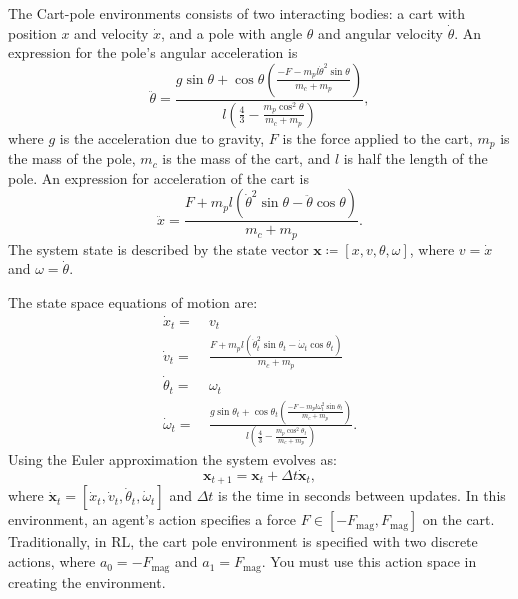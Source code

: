 \documentclass[]{article}
\begin{document}
The Cart-pole environments consists of two interacting bodies: a cart with position $x$ and velocity $\dot x$, and a pole with angle $\theta$ and angular velocity $\dot \theta$. 
%
An expression for the pole's angular acceleration is 
%
\begin{equation}
    \ddot \theta = \frac{g \sin{\theta} + \cos{\theta}\left( \frac{-F-m_p l \dot \theta^2 \sin \theta}{m_c + m_p}\right )}{l \left ( \frac{4}{3} - \frac{m_p \cos^2{\theta}}{m_c + m_p}\right )},
\end{equation}
%
where $g$ is the acceleration due to gravity, $F$ is the force applied to the cart, $m_p$ is the mass of the pole, $m_c$ is the mass of the cart, and $l$ is half the length of the pole. 
%
An expression for acceleration of the cart is 
%
\begin{equation}
    \ddot x = \frac{F + m_p l (\dot \theta^2 \sin{\theta} - \ddot \theta \cos{\theta})}{m_c + m_p}.    
\end{equation}
%
The system state is described by the state vector $\mathbf{x} \coloneqq [x, v, \theta, \omega ]$, where $v = \dot x$ and $\omega = \dot \theta$. 

The state space equations of motion are:
%
\begin{align}
    \dot x_{t} = &\ v_t \\
    \dot v_{t} = &\ \frac{F + m_p l (\dot \theta_t^2 \sin{\theta_t} - \dot \omega_t \cos{\theta_t})}{m_c + m_p} \\
    \dot \theta_t = &\ \omega_t \\
    \dot \omega_t = &\ \frac{g \sin{\theta_t} + \cos{\theta_t}\left( \frac{-F-m_p l \omega_t^2 \sin \theta_t}{m_c + m_p}\right )}{l \left ( \frac{4}{3} - \frac{m_p \cos^2{\theta_t}}{m_c + m_p}\right )}.
\end{align}
%
Using the Euler approximation the system evolves as:
\begin{equation}
    \mathbf{x}_{t+1} = \mathbf{x}_t + \Delta t \dot {\mathbf{x}}_t,
\end{equation}
where $\dot {\mathbf{x}}_t = [\dot x_t, \dot v_t, \dot \theta_t, \dot \omega_t]$ and $\Delta t$ is the time in seconds between updates. 
%
In this environment, an agent's action specifies a force $F \in [-F_\text{mag}, F_\text{mag}]$ on the cart. Traditionally, in RL, the cart pole environment is specified with two discrete actions, where $a_0 = -F_\text{mag}$ and $a_1 = F_\text{mag}$. You must use this action space in creating the environment.
\end{document}
